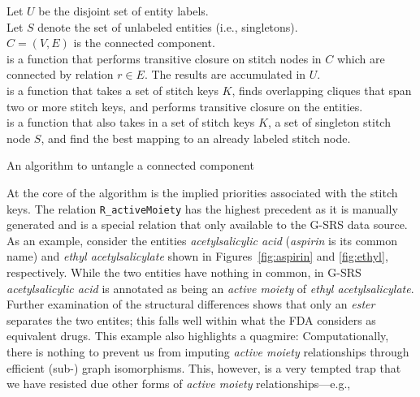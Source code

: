 \documentclass{bioinfo}
\begin{document}
\begin{methods}
\begin{algorithm}\label{algo:untangle}
\SetAlgoLined
\DontPrintSemicolon
Let $U$ be the disjoint set of entity labels.\\
Let $S$ denote the set of unlabeled entities (i.e., singletons).\\
$C=(V,E)$ is the connected component.\\
 is a function that performs transitive closure on
stitch nodes in $C$ which are connected by relation $r\in E$. The results are
accumulated in $U$.\\
 is a function that takes a set of stitch keys
$K$, finds overlapping cliques that span two or more stitch keys,
and performs transitive closure on the entities.\\
 is a function that also takes in a set of
stitch keys $K$, a set of singleton stitch node $S$, and find the best
mapping to an already labeled stitch node.\\
\;
\;
\;
\;
\;
 \caption{An algorithm to untangle a connected component}
\end{algorithm}
At the core of the algorithm is the implied priorities associated with
the stitch keys. The relation \texttt{R\_activeMoiety} has the highest
precedent as it is manually generated and is a special relation
that only available to the G-SRS data source. As an
example, consider the entities \emph{acetylsalicylic acid}
(\emph{aspirin} is its common name) and \emph{ethyl acetylsalicylate}
shown in Figures~\ref{fig:aspirin} and \ref{fig:ethyl},
respectively. While the two entities have nothing in common, in G-SRS
\emph{acetylsalicylic acid} is annotated as being an \emph{active
moiety} of \emph{ethyl acetylsalicylate}. Further examination of the
structural differences shows that only an \emph{ester} separates the
two entites; this falls well within what the FDA considers as
equivalent drugs. This example also highlights a quagmire:
Computationally, there is nothing to prevent us from
imputing \emph{active moiety} relationships through efficient (sub-)
graph isomorphisms. This, however, is a very tempted trap that we have
resisted due other forms of \emph{active moiety} relationships---e.g.,

\end{methods}
\end{document}
